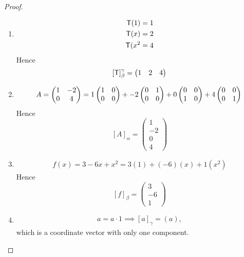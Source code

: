 \begin{proof}
\begin{enumerate}
\item
\begin{align*}
    \textsf{T}(1) = 1 \\
    \textsf{T}(x) = 2 \\
    \textsf{T}(x^2 = 4
\end{align*}
Hence
\[
    [\textsf{T}]_{\beta}^{\gamma} = \begin{pmatrix} 1 & 2 & 4 \end{pmatrix}
\]

\item
\[
    A = \begin{pmatrix} 1 & -2 \\ 0 & 4 \end{pmatrix}
          = 1 \begin{pmatrix} 1 & 0 \\ 0 & 0 \end{pmatrix}
          + -2 \begin{pmatrix} 0 & 1 \\ 0 & 0 \end{pmatrix}
          + 0 \begin{pmatrix} 0 & 0 \\ 1 & 0 \end{pmatrix}
          + 4 \begin{pmatrix} 0 & 0 \\ 0 & 1 \end{pmatrix} \\
\]
Hence
\[
    [A]_{\alpha} = \begin{pmatrix} 1 \\ -2 \\ 0 \\ 4 \end{pmatrix}
\]

\item
\begin{align*}
    f(x) = 3 - 6x + x^2 = 3(1) + (-6)(x) + 1(x^2)
\end{align*}
Hence
\[
    [f]_{\beta} = \begin{pmatrix}
        3 \\ -6 \\ 1
    \end{pmatrix}
\]

\item
\begin{align*}
    a = a \cdot 1 \implies [a]_{\gamma} = (a),
\end{align*}
which is a coordinate vector with only one component.

\end{enumerate}
\end{proof}

